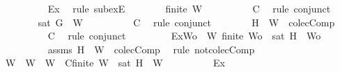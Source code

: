 \begin{isabellebody}
\ \ \ \ \ \ \ \ \isamarkupfalse%
\ Ex{}\ \isamarkupfalse%
\ {\isacharparenleft}rule\ subexE{\isacharparenright}\isanewline
\ \ \ \ \ \ \isamarkupfalse%
\ {\isachardoublequoteopen}finite\ W{}{\isachardoublequoteclose}\isanewline
\ \ \ \ \ \ \ \ \isamarkupfalse%
\ C{}\ \isamarkupfalse%
\ {\isacharparenleft}rule\ conjunct{}{\isacharparenright}\isanewline
\ \ \ \ \ \ \isamarkupfalse%
\ {\isachardoublequoteopen}{\isasymnot}{\isacharparenleft}sat\ {\isacharparenleft}{\isacharbraceleft}G{\isacharbraceright}\ {\isasymunion}\ W{}{\isacharparenright}{\isacharparenright}{\isachardoublequoteclose}\isanewline
\ \ \ \ \ \ \ \ \isamarkupfalse%
\ C{}\ \isamarkupfalse%
\ {\isacharparenleft}rule\ conjunct{}{\isacharparenright}\isanewline
\ \ \ \ \ \ \isamarkupfalse%
\ {\isachardoublequoteopen}{\isacharbraceleft}H{\isacharbraceright}\ {\isasymunion}\ W\ {\isasymnotin}\ colecComp{\isachardoublequoteclose}\isanewline
\ \ \ \ \ \ \ \ \isamarkupfalse%
\ C\ \isamarkupfalse%
\ {\isacharparenleft}rule\ conjunct{}{\isacharparenright}\ \isanewline
\ \ \ \ \ \ \isamarkupfalse%
\ Ex{}{\isacharcolon}{\isachardoublequoteopen}{\isasymexists}Wo\ {\isasymsubseteq}\ W{\isachardot}\ finite\ Wo\ {\isasymand}\ {\isasymnot}{\isacharparenleft}sat\ {\isacharparenleft}{\isacharbraceleft}H{\isacharbraceright}\ {\isasymunion}\ Wo{\isacharparenright}{\isacharparenright}{\isachardoublequoteclose}\isanewline
\ \ \ \ \ \ \ \ \isamarkupfalse%
\ assms\ {\isacartoucheopen}{\isacharbraceleft}H{\isacharbraceright}\ {\isasymunion}\ W\ {\isasymnotin}\ colecComp{\isacartoucheclose}\ \isamarkupfalse%
\ {\isacharparenleft}rule\ not{\isacharunderscore}colecComp{\isacharparenright}\isanewline
\ \ \ \ \ \ \isamarkupfalse%
\ W{}\ \ {\isachardoublequoteopen}W{}\ {\isasymsubseteq}\ W{\isachardoublequoteclose}\ \ C{}{\isacharcolon}{\isachardoublequoteopen}finite\ W{}\ {\isasymand}\ {\isasymnot}{\isacharparenleft}sat\ {\isacharparenleft}{\isacharbraceleft}H{\isacharbraceright}\ {\isasymunion}\ W{}{\isacharparenright}{\isacharparenright}{\isachardoublequoteclose}\isanewline
\ \ \ \ \ \ \ \ \isamarkupfalse%
\ Ex{}\ \isamarkupfalse%

\end{isabellebody}
